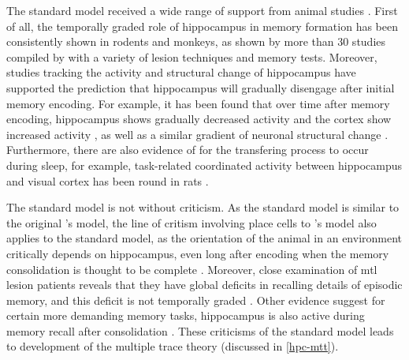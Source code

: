The standard model received a wide range of support from animal studies \citep{squire09}. First of all, the temporally graded role of hippocampus in memory formation has been consistently shown in rodents and monkeys, as shown by more than 30 studies compiled by \citet{frankland05} with a variety of lesion techniques and memory tests. Moreover, studies tracking the activity and structural change of hippocampus have supported the prediction that hippocampus will gradually disengage after initial memory encoding. For example, it has been found that over time after memory encoding, hippocampus shows gradually decreased activity and the cortex show increased activity \citep[e.g.][]{bontempi99, frankland04a, takehara-nishiuchi06}, as well as a similar gradient of neuronal structural change \citep[e.g.][]{routtenberg00, maviel04, restivo09}. Furthermore, there are also evidence of for the transfering process to occur during sleep, for example, task-related coordinated activity between hippocampus and visual cortex has been round in rats \citep{ji07}. 

The standard model is not without criticism. As the standard model is similar to the original \citet{marr71}'s model, the line of critism involving place cells to \citet{marr71}'s model also applies to the standard model, as the orientation of the animal in an environment critically depends on hippocampus, even long after encoding when the memory consolidation is thought to be complete \citet[e.g.][]{mumby99, sutherland01, clark05}. Moreover, close examination of \gls{mtl} lesion patients reveals that they have global deficits in recalling details of episodic memory, and this deficit is not temporally graded \citep{cipolotti01, viskontas02}. Other evidence suggest for certain more demanding memory tasks, hippocampus is also active during memory recall after consolidation \citep{ryan01, wheeler13}. These criticisms of the standard model leads to development of the multiple trace theory (discussed in \ref{hpc-mtt}).

